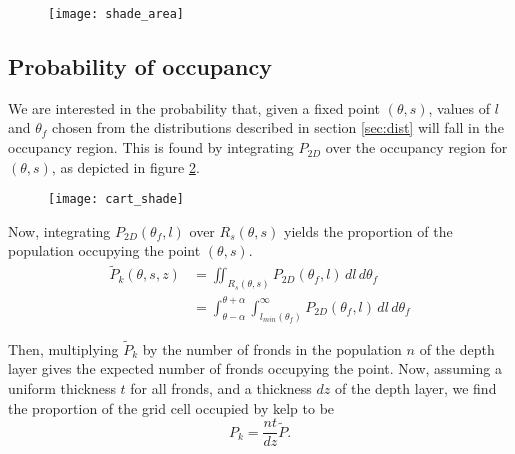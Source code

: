 \begin{figure}[h]
	\centering
	\texttt{[image: shade\_area]}
	\vspace{-2em}
	\label{fig:shade_area}
\end{figure}

\subsection{Probability of occupancy}
We are interested in the probability that, given a fixed point $(\theta,s)$, values of $l$ and $\theta_f$ chosen from the distributions described in section \ref{sec:dist} will fall in the occupancy region.
This is found by integrating $P_{2D}$ over the occupancy region for $(\theta,s)$, as depicted in figure \ref{fig:cart_shade}.

\begin{figure}[h]
	\centering
	\texttt{[image: cart\_shade]}
	\vspace{-3em}
	\label{fig:cart_shade}
\end{figure}

Now, integrating $P_{2D}(\theta_f,l)$ over $R_s(\theta,s)$ yields the proportion of the population occupying the point $(\theta,s)$.
\begin{align}
		\tilde{P}_k(\theta,s,z)	&= \iint_{R_s(\theta,s)}
								P_{2D}(\theta_f,l)
								\,dl\,d\theta_f \nonumber \\
							&= \int_{\theta-\alpha}^{\theta+\alpha} 
								\int_{l_{min}(\theta_f)}^\infty
								P_{2D}(\theta_f,l)
								\,dl\,d\theta_f
\end{align}

Then, multiplying $\tilde{P}_k$ by the number of fronds in the population $n$ of the depth layer gives the expected number of fronds occupying the point.
Now, assuming a uniform thickness $t$ for all fronds, and a thickness $dz$ of the depth layer, we find the proportion of the grid cell occupied by kelp to be
\begin{equation}
  P_k = \frac{nt}{dz}\tilde{P}.
\end{equation}

